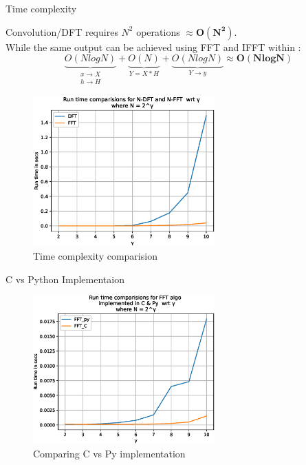 \documentclass[notheorems]{beamer}
\begin{document}
\begin{frame}{Time complexity}


Convolution/DFT requires $ N^{2}$ operations $\approx \boldsymbol{O(N^{2})}$.\\
While the same output can be achieved using FFT and IFFT within : 
\begin{equation}
   \underbrace{O(NlogN)}_{\substack{\text{$x \rightarrow X$} \\ {\text{$h \rightarrow H $}}  }} + 
   \underbrace{O(N)}_{\text{$Y = X*H$}} + 
   \underbrace{O(NlogN)}_{\text{$Y \rightarrow y$}} \approx \boldsymbol{O(NlogN)}
\end{equation}

 \begin{figure}[!ht]
	\includegraphics[width=7cm]{figs/dft_vs_fft.eps}
	\caption{Time complexity comparision}
\end{figure}

\end{frame}


\begin{frame}{C vs Python Implementaion}
 \begin{figure}[!ht]
	\includegraphics[width=7cm]{figs/fftpy_vs_fftc.eps}
	\caption{Comparing C vs Py implementation}
\end{figure}
\end{frame}
\end{document}
